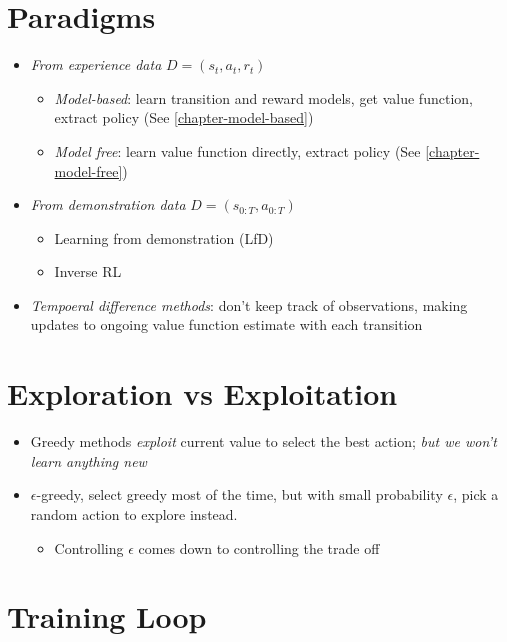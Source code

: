 \section{Paradigms}

  \begin{itemize}
    \item \emph{From experience data} $ D = \left( s_{t}, a_{t}, r_{t} \right) $
    \begin{itemize}
      \item \emph{Model-based}: learn transition and reward models,
      get value function, extract policy (See \ref{chapter-model-based})
      \item \emph{Model free}: learn value function directly, extract policy
      (See \ref{chapter-model-free})
    \end{itemize}

    \item \emph{From demonstration data} $ D = \left( s_{0:T}, a_{0:T} \right) $
    \begin{itemize}
      \item Learning from demonstration (LfD)
      \item Inverse RL
    \end{itemize}

    \item \emph{Tempoeral difference methods}: don't keep track of observations,
    making updates to ongoing value function estimate with each transition
  \end{itemize}

\section{Exploration vs Exploitation}

  \begin{itemize}
    \item Greedy methods \emph{exploit} current value to select the best action;
    \emph{but we won't learn anything new}
    \item $ \epsilon $-greedy, select greedy most of the time, but with small
    probability $ \epsilon $, pick a random action to explore instead.
    \begin{itemize}
      \item Controlling $ \epsilon $ comes down to controlling the trade off
    \end{itemize}
  \end{itemize}

\section{Training Loop}

